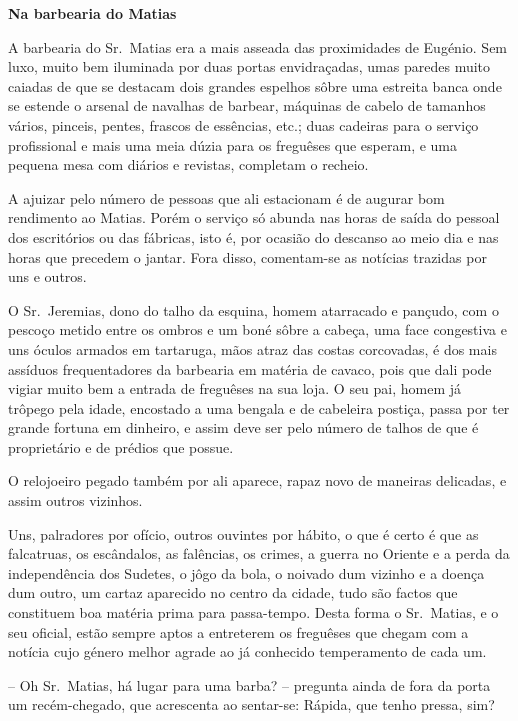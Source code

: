 \documentclass[9pt]{article}
\begin{document}
\begin{center}\bf\large Na barbearia do Matias\end{center}

A barbearia do Sr.\ Matias era a mais asseada das proximidades de Eugé\-nio. Sem luxo, muito bem iluminada por duas portas envidraçadas, umas paredes
muito caiadas de que se destacam dois gran\-des espe\-lhos sôbre uma estreita
banca onde se estende o arsenal de nava\-lhas de barbear, máquinas de cabelo
de tamanhos vários, pinceis, pentes, frascos de essências, etc.; duas cadeiras
para o serviço profissional e mais uma meia dúzia para os freguêses que esperam, e uma pequena mesa com diários e revistas, completam o recheio.

A ajuizar pelo número de pessoas que ali estacionam é de augurar bom
rendimento ao Matias. Porém o serviço só abunda nas horas de saída do pessoal dos escritórios ou das fá\-bri\-cas, isto é, por ocasião do descanso ao meio
dia e nas horas que precedem o jantar. Fora disso, comentam-se as notícias
trazidas por uns e outros.

O Sr.\ Jeremias, dono do ta\-lho da esquina, homem atarracado e pan\-çudo, com
o pescoço metido entre os ombros e um boné sôbre a cabeça, uma face congestiva e uns óculos armados em tartaruga, mãos atraz das costas corcovadas, é dos
mais assíduos frequentadores da barbearia em ma\-té\-ria de cavaco, pois que dali
pode vigiar muito bem a entrada de freguêses na sua loja. O seu pai, homem
já trôpego pela idade, encostado a uma bengala e de cabeleira postiça, passa
por ter gran\-de fortuna em dinheiro, e assim deve ser pelo número de ta\-lhos
de que é proprietário e de prédios que possue.

O relojoeiro pegado também por ali aparece, rapaz novo de maneiras delicadas, e assim outros vizinhos.

Uns, palradores por ofício, outros ouvintes por hábito, o que é certo é
que as falcatruas, os escândalos, as falências, os crimes, a guerra no Oriente
e a perda da independên\-cia dos Sudetes, o jôgo da bola, o noivado dum vizinho
e a doença dum outro, um cartaz aparecido no centro da cidade, tudo são factos
que constituem boa ma\-té\-ria prima para passa-tempo. Desta forma o Sr.\ Matias,
e o seu oficial, estão sempre aptos a entreterem os freguêses que chegam com a notícia cujo género me\-lhor agrade ao já conhecido temperamento de
cada um.

-- Oh Sr.\ Matias, há lugar para uma barba? -- pregunta ainda de fora da
porta um recém-chegado, que acrescenta ao sentar-se: Rápida, que tenho pressa,
sim?
\end{document}
